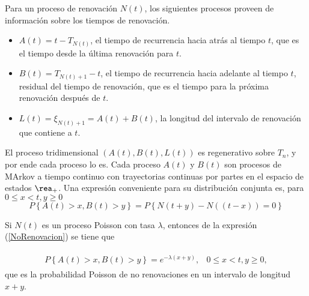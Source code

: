 \begin{Def}
Para un proceso de renovaci\'on $N\left(t\right)$, los siguientes procesos proveen de informaci\'on sobre los tiempos de renovaci\'on.
\begin{itemize}
\item $A\left(t\right)=t-T_{N\left(t\right)}$, el tiempo de recurrencia hacia atr\'as al tiempo $t$, que es el tiempo desde la \'ultima renovaci\'on para $t$.

\item $B\left(t\right)=T_{N\left(t\right)+1}-t$, el tiempo de recurrencia hacia adelante al tiempo $t$, residual del tiempo de renovaci\'on, que es el tiempo para la pr\'oxima renovaci\'on despu\'es de $t$.

\item $L\left(t\right)=\xi_{N\left(t\right)+1}=A\left(t\right)+B\left(t\right)$, la longitud del intervalo de renovaci\'on que contiene a $t$.
\end{itemize}
\end{Def}

\begin{Note}
El proceso tridimensional $\left(A\left(t\right),B\left(t\right),L\left(t\right)\right)$ es regenerativo sobre $T_{n}$, y por ende cada proceso lo es. Cada proceso $A\left(t\right)$ y $B\left(t\right)$ son procesos de MArkov a tiempo continuo con trayectorias continuas por partes en el espacio de estados $\rea_{+}$. Una expresi\'on conveniente para su distribuci\'on conjunta es, para $0\leq x<t,y\geq0$
\begin{equation}\label{NoRenovacion}
P\left\{A\left(t\right)>x,B\left(t\right)>y\right\}=
P\left\{N\left(t+y\right)-N\left((t-x)\right)=0\right\}
\end{equation}
\end{Note}

\begin{Ejem}
Si $N\left(t\right)$ es un proceso Poisson con tasa $\lambda$, entonces de la expresi\'on (\ref{NoRenovacion}) se tiene que

\begin{eqnarray*}
\begin{array}{lc}
P\left\{A\left(t\right)>x,B\left(t\right)>y\right\}=e^{-\lambda\left(x+y\right)},&0\leq x<t,y\geq0,
\end{array}
\end{eqnarray*}
que es la probabilidad Poisson de no renovaciones en un intervalo de longitud $x+y$.

\end{Ejem}

